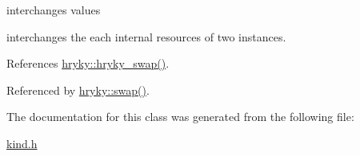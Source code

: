 interchanges values 

interchanges the each internal resources of two instances. 

References \hyperlink{namespacehryky_add9c1c1fdfda07cd47bcb7c16d3a823a}{hryky\-::hryky\-\_\-swap()}.



Referenced by \hyperlink{namespacehryky_a38b65dba4a76741a904282b0e41424e5}{hryky\-::swap()}.



The documentation for this class was generated from the following file\-:\begin{DoxyCompactItemize}
\item 
\hyperlink{kind_8h}{kind.\-h}\end{DoxyCompactItemize}

